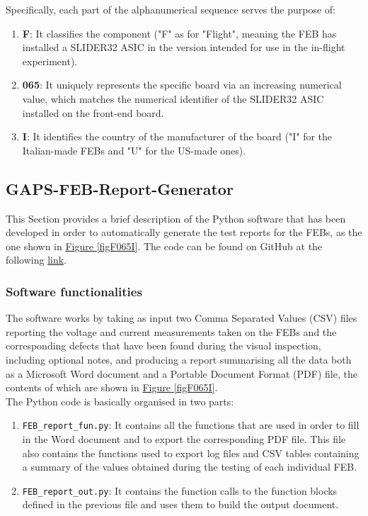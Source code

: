 \noindent
Specifically, each part of the alphanumerical sequence serves the purpose of:

\begin{enumerate}
    \itemsep0em 
    \item \textbf{F}: It classifies the component ("F" as for "Flight", meaning the FEB has installed a SLIDER32 ASIC in the version intended for use in the in-flight experiment).
    \item \textbf{065}: It uniquely represents the specific board via an increasing numerical value, which matches the numerical identifier of the SLIDER32 ASIC installed on the front-end board.
    \item \textbf{I}: It identifies the country of the manufacturer of the board ("I" for the Italian-made FEBs and "U" for the US-made ones).
\end{enumerate}

\normalsize

\subsection{GAPS-FEB-Report-Generator}
This Section provides a brief description of the Python software that has been developed in order to automatically generate the test reports for the FEBs, as the one shown in \hyperref[figF065I]{Figure \ref{figF065I}}. The code can be found on GitHub at the following \href{https://github.com/lucaghislo/GAPS-FEB-report-generator}{\underline{link}}.


\subsubsection{Software functionalities} \label{GAPSrepfun}
The software works by taking as input two Comma Separated Values (CSV) files reporting the voltage and current measurements taken on the FEBs and the corresponding defects that have been found during the visual inspection, including optional notes, and producing a report summarising all the data both as a Microsoft Word document and a Portable Document Format (PDF) file, the contents of which are shown in \hyperref[figF065I]{Figure \ref{figF065I}}.\\

\noindent
The Python code is basically organised in two parts:

\begin{enumerate}
    \itemsep0em
    \item \texttt{FEB\_report\_fun.py}: It contains all the functions that are used in order to fill in the Word document and to export the corresponding PDF file. This file also contains the functions used to export log files and CSV tables containing a summary of the values obtained during the testing of each individual FEB.
    \item \texttt{FEB\_report\_out.py}: It contains the function calls to the function blocks defined in the previous file and uses them to build the output document.
\end{enumerate}


